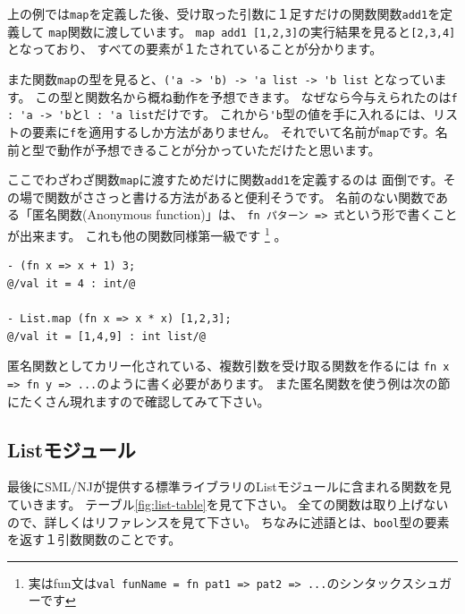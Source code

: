 \documentclass[11pt,a4paper]{article}
\begin{document}
上の例では\lstinline{map}を定義した後、受け取った引数に１足すだけの関数関数\lstinline{add1}を定義して
\lstinline{map}関数に渡しています。
\lstinline{map add1 [1,2,3]}の実行結果を見ると\lstinline{[2,3,4]}となっており、
すべての要素が１たされていることが分かります。

また関数\lstinline{map}の型を見ると、\lstinline{('a -> 'b) -> 'a list -> 'b list}
となっています。
この型と関数名から概ね動作を予想できます。
なぜなら今与えられたのは\lstinline{f : 'a -> 'b}と\lstinline{l : 'a list}だけです。
これから\lstinline{'b}型の値を手に入れるには、リストの要素に\lstinline{f}を適用するしか方法がありません。
それでいて名前が\lstinline{map}です。名前と型で動作が予想できることが分かっていただけたと思います。

ここでわざわざ関数\lstinline{map}に渡すためだけに関数\lstinline{add1}を定義するのは
面倒です。その場で関数がささっと書ける方法があると便利そうです。
名前のない関数である「匿名関数(Anonymous function)」は、
\lstinline{fn パターン => 式}という形で書くことが出来ます。
これも他の関数同様第一級です
\footnote{実はfun文は\lstinline{val funName = fn pat1 => pat2 => ...}のシンタックスシュガーです}
。

\begin{lstlisting}[caption=匿名関数,label=code:anonymous]
- (fn x => x + 1) 3;
@/val it = 4 : int/@

- List.map (fn x => x * x) [1,2,3];
@/val it = [1,4,9] : int list/@
\end{lstlisting}

匿名関数としてカリー化されている、複数引数を受け取る関数を作るには
\lstinline{fn x => fn y => ...}のように書く必要があります。
また匿名関数を使う例は次の節にたくさん現れますので確認してみて下さい。

\subsection{Listモジュール}

最後にSML/NJが提供する標準ライブラリのListモジュールに含まれる関数を見ていきます。
テーブル\ref{fig:list-table}を見て下さい。
全ての関数は取り上げないので、詳しくはリファレンスを見て下さい\cite{sml-libs}。
ちなみに述語とは、\lstinline{bool}型の要素を返す１引数関数のことです。
\end{document}
